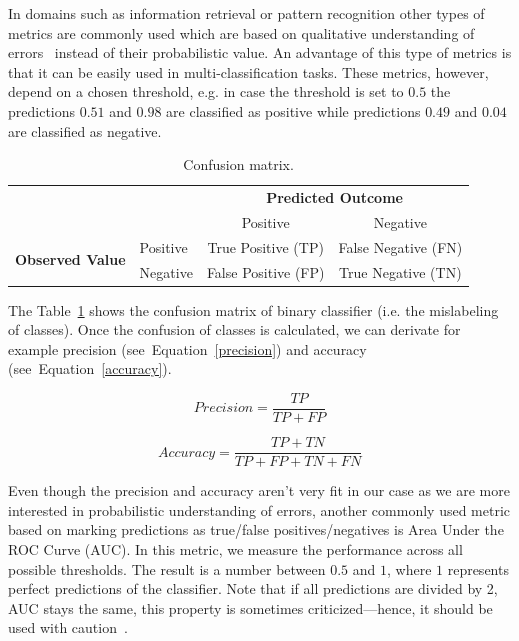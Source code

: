 In domains such as information retrieval or pattern recognition other types of metrics are commonly used which are based on qualitative understanding of errors~\cite{Pelanek2015a} instead of their probabilistic value. An advantage of this type of metrics is that it can be easily used in multi-classification tasks. These metrics, however, depend on a chosen threshold, e.g. in case the threshold is set to $0.5$ the predictions $0.51$ and $0.98$ are classified as positive while predictions $0.49$ and $0.04$ are classified as negative.

\begin{table}[htbp]
  \centering
  \caption{Confusion matrix.}
  \begin{tabular}{ l l c c }
   \toprule[\heavyrulewidth]
   & & \multicolumn{2}{c}{\textbf{Predicted Outcome}} \\
   & & Positive & Negative \\
   \midrule[\heavyrulewidth]
   \multirow{2}{5em}{\textbf{Observed Value}}
   & Positive & True Positive (TP) & False Negative (FN) \\
   & Negative & False Positive (FP) & True Negative (TN) \\
   \bottomrule[\heavyrulewidth]
  \end{tabular}
  \label{table:confusion-matrix}
\end{table}

The Table~\ref{table:confusion-matrix} shows the confusion matrix of binary classifier (i.e. the mislabeling of classes). Once the confusion of classes is calculated, we can derivate for example precision (see~Equation~\ref{precision}) and accuracy (see~Equation~\ref{accuracy}).

\begin{equation} \label{precision}
  \mathit{Precision} = \frac{TP}{TP + FP}
\end{equation}

\begin{equation} \label{accuracy}
  \mathit{Accuracy} = \frac{TP + TN}{TP + FP + TN + FN}
\end{equation}

Even though the precision and accuracy aren't very fit in our case as we are more interested in probabilistic understanding of errors, another commonly used metric based on marking predictions as true/false positives/negatives is Area Under the ROC Curve (AUC). In this metric, we measure the performance across all possible thresholds. The result is a number between $0.5$ and $1$, where $1$ represents perfect predictions of the classifier. Note that if all predictions are divided by 2, AUC stays the same, this property is sometimes criticized---hence, it should be used with caution~\cite{Pelanek2015a}.

